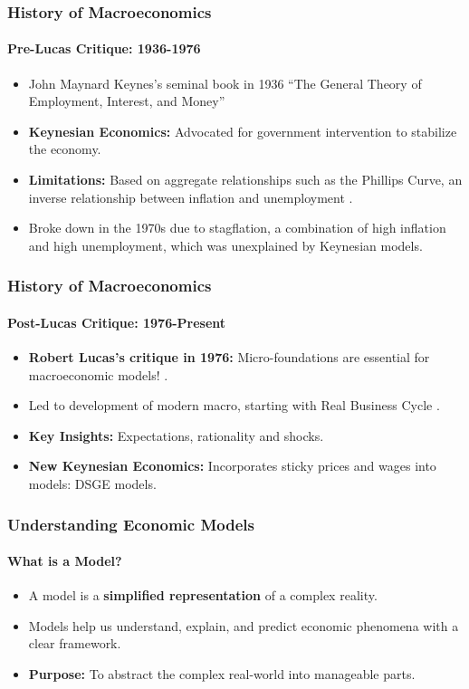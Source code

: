 \documentclass{beamer}
\begin{document}
\begin{frame}
    \frametitle{History of Macroeconomics}
    \framesubtitle{Pre-Lucas Critique: 1936-1976}
        \begin{itemize}
            \item John Maynard Keynes's seminal book in 1936  \enquote{The General Theory of Employment, Interest, and Money}
            \item \textbf{Keynesian Economics:} Advocated for government intervention to stabilize the economy.
            \item \textbf{Limitations:} Based on aggregate relationships such as the Phillips Curve,
            an inverse relationship between inflation and unemployment \parencite{Phillips_1958}.
            \item Broke down in the 1970s due to stagflation, a combination of high inflation and high unemployment,
            which was unexplained by Keynesian models.
        \end{itemize}
    \end{frame}
    \begin{frame}
        \frametitle{History of Macroeconomics}
        \framesubtitle{Post-Lucas Critique: 1976-Present}
            \begin{itemize}
                \item \textbf{Robert Lucas's critique in 1976:} Micro-foundations are essential for macroeconomic models! \parencite{Lucas_1976}.
                \item Led to development of modern macro, starting with Real Business Cycle \textcite{Kydland_Prescott_1982}.
                \item \textbf{Key Insights:} Expectations, rationality and shocks.
                \item \textbf{New Keynesian Economics:} Incorporates sticky prices and wages into models: DSGE models.
            \end{itemize}
        \end{frame}
                    
\begin{frame}
    \frametitle{Understanding Economic Models}
    \framesubtitle{What is a Model?}
        \begin{itemize}
            \item A model is a \textbf{simplified representation} of a complex reality.
            \item Models help us understand, explain, and predict economic phenomena with a clear framework.
            \item \textbf{Purpose:} To abstract the complex real-world into manageable parts.
        \end{itemize}
    \end{frame}
\end{document}

